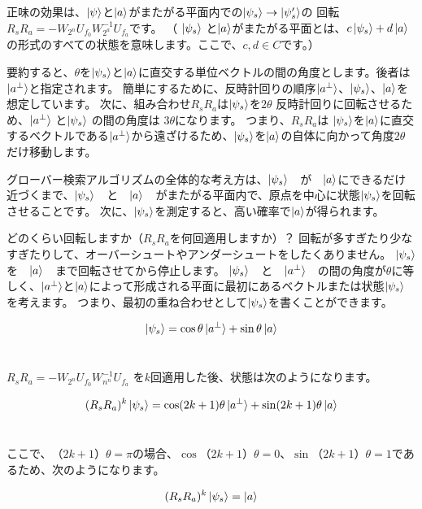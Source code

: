正味の効果は、$\ket{\psi}$と$\ket{a}$がまたがる平面内での$ \ket{\psi_s} \to \ket{\psi_s^{\prime}}$の
回転$R_s R_a = −W_{2^n} U_{f_0} W_{2^a}^{-1} U_{f_a}$です。
（ $ \ket{\psi_s}$ と$\ket{a}$がまたがる平面とは、$c \ket{\psi_s} + d \ket{a}$の形式のすべての状態を意味します。ここで、$c,d \in C$です。）

要約すると、$\theta$を$ \ket{\psi_s}$と$\ket{a}$に直交する単位ベクトルの間の角度とします。後者は$\ket{a^{\bot}}$と指定されます。 簡単にするために、反時計回りの順序$\ket{a^{\bot}}$、$\ket{\psi_s}$、$\ket{a}$を想定しています。 次に、組み合わせ$R_s R_a$は$\ket{\psi_s}$を$2 \theta$ 反時計回りに回転させるため、$\ket{a^{\bot}}$ と$\ket{\psi_s}$ の間の角度は $3 \theta$になります。 つまり、$R_s R_a$は $\ket{\psi_s}$を$\ket{a}$に直交するベクトルである$\ket{a^{\bot}}$から遠ざけるため、$\ket{\psi_s}$を$\ket{a}$の自体に向かって角度$2 \theta$だけ移動します。

グローバー検索アルゴリズムの全体的な考え方は、$\ket{\psi_s}$　が　$\ket{a}$にできるだけ近づくまで、$\ket{\psi_s}$　と　$\ket{a}$　がまたがる平面内で、原点を中心に状態$\ket{\psi_s}$を回転させることです。 次に、$\ket{\psi_s}$を測定すると、高い確率で$\ket{a}$が得られます。

どのくらい回転しますか（$R_s R_a$を何回適用しますか）？ 回転が多すぎたり少なすぎたりして、オーバーシュートやアンダーシュートをしたくありません。 $\ket{\psi_s}$　を　$\ket{a}$　まで回転させてから停止します。 $\ket{\psi_s}$　と　$\ket{a^{\bot}}$　の間の角度が$\theta$に等しく、$\ket{a^{\bot}}$と$\ket{a}$によって形成される平面に最初にあるベクトルまたは状態$\ket{\psi_s}$を考えます。 つまり、最初の重ね合わせとして$\ket{\psi_s}$を書くことができます。


\begin{equation}
\label{82}
\ket{\psi_s}
=
\cos \theta \ket{a^{\bot}} + \sin \theta \ket{a}
\end{equation}　

$R_s R_a = − W_{2^n} U_{f_0} W_{n^n}^{-1} U_{f_a}$ を$k$回適用した後、状態は次のようになります。

\begin{equation}
\label{83}
(R_s R_a)^k \ket{\psi_s} 
=
\cos (2k+1) \theta \ket{a^{\bot}} + \sin (2k+1) \theta \ket{a}
\end{equation}　

ここで、$（2k + 1）\theta = \pi $の場合、$ \cos（2k + 1）\theta = 0$、$\sin（2k + 1） \theta = 1$であるため、次のようになります。

\begin{equation}
\label{84}
(R_s R_a)^k \ket{\psi_s} 
=
\ket{a}
\end{equation}　

